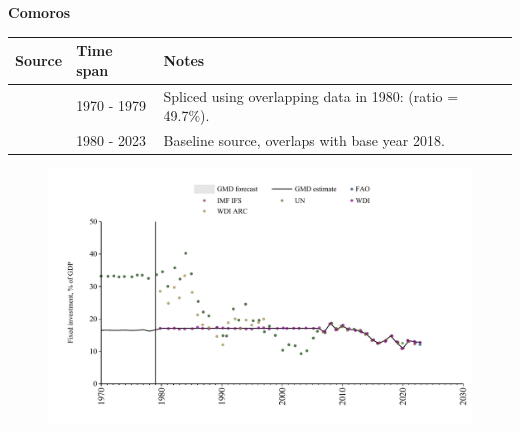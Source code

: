 \documentclass[12pt,a4paper,landscape]{article}
\begin{document}
\begin{adjustbox}{max totalsize={\paperwidth}{\paperheight},center}
\begin{minipage}[t][\textheight][t]{\textwidth}
\vspace*{0.5cm}
{}
\begin{center}
{\Large\bfseries Comoros}
\end{center}
\vspace{0.5cm}
\begin{table}[H]
\centering
\small
\begin{tabular}{|l|l|l|}
\hline
\textbf{Source} & \textbf{Time span} & \textbf{Notes} \\
\hline
\rowcolor{white}\cite{UN}& 1970 - 1979 &Spliced using overlapping data in 1980: (ratio = 49.7\%).\\
\rowcolor{lightgray}\cite{WDI}& 1980 - 2023 &Baseline source, overlaps with base year 2018.\\
\hline
\end{tabular}
\end{table}
\begin{figure}[H]
\centering
\includegraphics[width=\textwidth,height=0.6\textheight,keepaspectratio]{graphs/COM_finv_GDP.pdf}
\end{figure}
\end{minipage}
\end{adjustbox}
\end{document}
